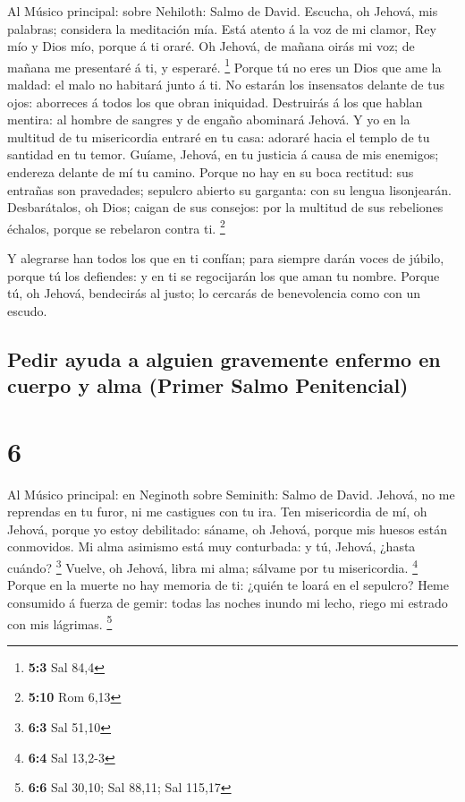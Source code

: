  Al Músico principal: sobre Nehiloth: Salmo de David.
Escucha, oh Jehová, mis palabras; considera la meditación mía.
 Está atento á la voz de mi clamor, Rey mío y Dios mío,
porque á ti oraré.  Oh Jehová, de mañana oirás mi voz; de
mañana me presentaré á ti, y esperaré. \footnote{\textbf{5:3} Sal 84,4}
 Porque tú no eres un Dios que ame la maldad: el malo no
habitará junto á ti.  No estarán los insensatos delante de
tus ojos: aborreces á todos los que obran iniquidad. 
Destruirás á los que hablan mentira: al hombre de sangres y de engaño
abominará Jehová.  Y yo en la multitud de tu misericordia
entraré en tu casa: adoraré hacia el templo de tu santidad en tu temor.
 Guíame, Jehová, en tu justicia á causa de mis enemigos;
endereza delante de mí tu camino.  Porque no hay en su boca
rectitud: sus entrañas son pravedades; sepulcro abierto su garganta: con
su lengua lisonjearán.  Desbarátalos, oh Dios; caigan de
sus consejos: por la multitud de sus rebeliones échalos, porque se
rebelaron contra ti. \footnote{\textbf{5:10} Rom 6,13}

 Y alegrarse han todos los que en ti confían; para siempre
darán voces de júbilo, porque tú los defiendes: y en ti se regocijarán
los que aman tu nombre.  Porque tú, oh Jehová, bendecirás
al justo; lo cercarás de benevolencia como con un escudo.

\hypertarget{pedir-ayuda-a-alguien-gravemente-enfermo-en-cuerpo-y-alma-primer-salmo-penitencial}{%
\subsection{Pedir ayuda a alguien gravemente enfermo en cuerpo y alma
(Primer Salmo
Penitencial)}\label{pedir-ayuda-a-alguien-gravemente-enfermo-en-cuerpo-y-alma-primer-salmo-penitencial}}

\hypertarget{section-5}{%
\section{6}\label{section-5}}

 Al Músico principal: en Neginoth sobre Seminith: Salmo de
David. Jehová, no me reprendas en tu furor, ni me castigues con tu ira.
 Ten misericordia de mí, oh Jehová, porque yo estoy
debilitado: sáname, oh Jehová, porque mis huesos están conmovidos.
 Mi alma asimismo está muy conturbada: y tú, Jehová, ¿hasta
cuándo? \footnote{\textbf{6:3} Sal 51,10}  Vuelve, oh
Jehová, libra mi alma; sálvame por tu misericordia. \footnote{\textbf{6:4}
  Sal 13,2-3}  Porque en la muerte no hay memoria de ti:
¿quién te loará en el sepulcro?  Heme consumido á fuerza de
gemir: todas las noches inundo mi lecho, riego mi estrado con mis
lágrimas. \footnote{\textbf{6:6} Sal 30,10; Sal 88,11; Sal 115,17}

